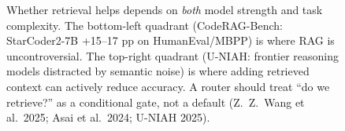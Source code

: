 {\begin{figure}[H]
\caption{Whether retrieval helps depends on \emph{both} model strength and
task complexity. The bottom-left quadrant (CodeRAG-Bench: StarCoder2-7B
+15--17 pp on HumanEval/MBPP) is where RAG is uncontroversial. The top-right
quadrant (U-NIAH: frontier reasoning models distracted by semantic noise)
is where adding retrieved context can actively reduce accuracy. A router
should treat ``do we retrieve?'' as a conditional gate, not a default
(Z.~Z.~Wang et al.\ 2025; Asai et al.\ 2024; U-NIAH 2025).}
\label{fig-retrieval-conditional}
\end{figure}
}

